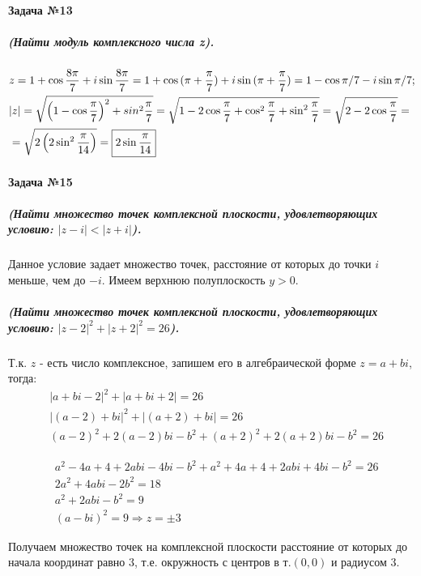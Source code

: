 \documentclass[a4paper,12pt]{report}
\begin{document}
\paragraph{Задача №13}
\subparagraph{(Найти модуль комплексного числа z).}

\begin{align*}
	&z=1+\cos{\dfrac{8\pi}{7}}+i\sin{\dfrac{8\pi}{7}}=	
	1+\cos{(\pi+\dfrac{\pi}{7})}+i\sin{(\pi+\dfrac{\pi}{7})}=	
	1-\cos\pi/7-i\sin\pi/7;\\
	&|z|=\sqrt{\left(1-\cos{\dfrac{\pi}{7}}\right)^2+sin^2{\dfrac{\pi}{7}}}=
	\sqrt{1-2\cos{\dfrac{\pi}{7}}+
	\cos^2{\dfrac{\pi}{7}}+\sin^2\dfrac{\pi}{7}}=
	\sqrt{2-2\cos{\dfrac{\pi}{7}}}=\\
	&=\sqrt{2\left(2\sin^2{\dfrac{\pi}{14}}\right)}=
	\fbox{$ 2\sin{\dfrac{\pi}{14}} $}
\end{align*}
 
\paragraph{Задача №15}
\subparagraph{(Найти множество точек комплексной плоскости, удовлетворяющих условию: $ |z-i|<|z+i| $).} 
Данное условие задает множество точек, расстояние от которых 
до точки $ i $ меньше, чем до $ -i $. Имеем верхнюю полуплоскость $ y>0 $.

\subparagraph{(Найти множество точек комплексной плоскости, удовлетворяющих условию: $ |z-2|^2+|z+2|^2=26 $).\\}
Т.к. $ z $ - есть число комплексное, запишем его в алгебраической форме
$ z=a+bi $, тогда:
\begin{align*}
	&|a+bi-2|^2+|a+bi+2|=26\\
	&|(a-2)+bi|^2+|(a+2)+bi|=26\\	
	&(a-2)^2+2(a-2)bi-b^2+(a+2)^2+2(a+2)bi-b^2=26
\end{align*}


\begin{align*}
	&a^2-4a+4+2abi-4bi-b^2+a^2+4a+4+2abi+4bi-b^2=26\\
	&2a^2+4abi-2b^2=18\\
	&a^2+2abi-b^2=9\\
	&(a-bi)^2=9 \Rightarrow z=\pm 3
\end{align*}

Получаем множество точек на комплексной плоскости расстояние от которых до начала координат равно 3, т.е. окружность с центров в т.$ (0, 0) $ и радиусом 3.
\end{document}
